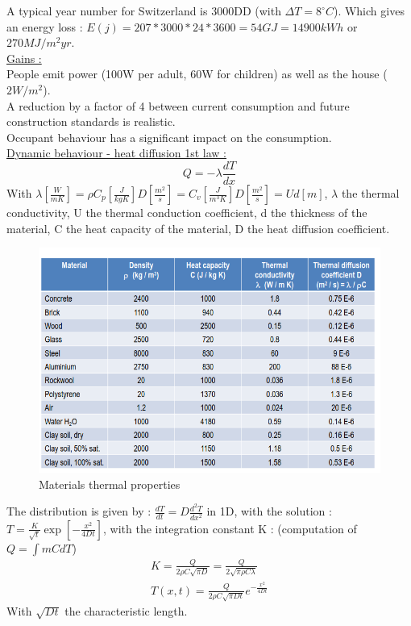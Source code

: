 \documentclass[../main.tex]{subfiles}
\begin{document}
A typical year number for Switzerland is 3000DD (with $\Delta T = 8^\circ C$). Which gives an energy loss : $E(j) = 207*3000*24*3600 = 54GJ = 14900kWh$ or $270 MJ/m^2yr$.\\

\quad \underline{Gains :}\\
People emit power (100W per adult, 60W for children) as well as the house ($2W/m^2$). \\

A reduction by a factor of 4 between current consumption and future construction standards is realistic.\\
\warning Occupant behaviour has a significant impact on the consumption.\\


\quad \underline{Dynamic behaviour - heat diffusion 1st law :}\\
\begin{equation}
    Q = -\lambda \frac{dT}{dx}
\end{equation}
With $\lambda [\frac{W}{mK}] = \rho C_p [\frac{J}{kg K}] D[\frac{m^2}{s}] = C_v [\frac{J}{m^3K}] D[\frac{m^2}{s}] = U d[m]$, $\lambda$ the thermal conductivity, U the thermal conduction coefficient, d the thickness of the material, C the heat capacity of the material, D the heat diffusion coefficient. 

\begin{figure}[hbt!]
    \centering
    \includegraphics[width=0.5\linewidth]{IMAGES/Renewable/Screenshot from 2025-03-11 20-18-18.png}
    \caption{Materials thermal properties}
\end{figure}

The distribution is given by : $\frac{dT}{dt} = D \frac{d^2 T}{dx^2}$ in 1D, with the solution : $T = \frac{K}{\sqrt{t}} \exp[-\frac{x^2}{4Dt}]$, with the integration constant K : (computation of $Q = \int m CdT$)
\begin{equation}
    \begin{gathered}
        K = \frac{Q}{2\rho C \sqrt{\pi D}} = \frac{Q}{2\sqrt{\pi \rho C \lambda}}\\
        T(x,t) = \frac{Q}{2\rho C \sqrt{\pi Dt}} e^{-\frac{x^2}{4Dt}}
    \end{gathered}
\end{equation}
With $\sqrt{Dt}$ the characteristic length. \\
\end{document}
